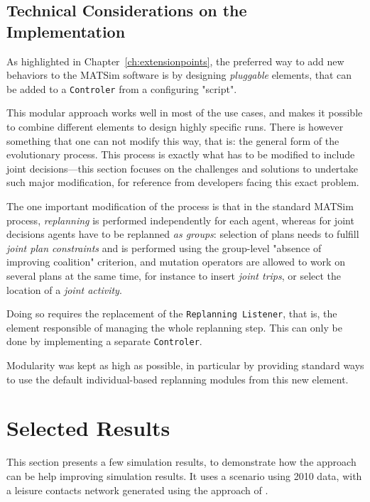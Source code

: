 {%
\subsection{Technical Considerations on the Implementation}
As highlighted in Chapter~\ref{ch:extensionpoints}, the preferred way to add new behaviors to the MATSim software is by designing \emph{pluggable} elements, that can be added to a \lstinline|Controler| from a configuring "script".

This modular approach works well in most of the use cases, and makes it possible to combine different elements to design highly specific runs. There is however something that one can not modify this way, that is: the general form of the evolutionary process. This process is exactly what has to be modified to include joint decisions---this section focuses on the challenges and solutions to undertake such major modification, for reference from developers facing this exact problem.

The one important modification of the process is that in the standard MATSim process, \emph{replanning} is performed independently for each agent, whereas for joint decisions agents have to be replanned \emph{as groups}: selection of plans needs to fulfill \emph{joint plan constraints} and is performed using the group-level "absence of improving coalition" criterion, and mutation operators are allowed to work on several plans at the same time, for instance to insert \emph{joint trips}, or select the location of a \emph{joint activity}.

Doing so requires the replacement of the \lstinline|Replanning Listener|, that is, the element responsible of managing the whole replanning step. This can only be done by implementing a separate \lstinline|Controler|. 

Modularity was kept as high as possible, in particular by providing standard ways to use the default individual-based replanning modules from this new element.

\section{Selected Results}
\label{sec:td:results}
This section presents a few simulation results, to demonstrate how the approach can be help improving simulation results. It uses a scenario using 2010 data, with a leisure contacts network generated using the approach of \citet{ArentzeEtAl_SN_2013}.

}
